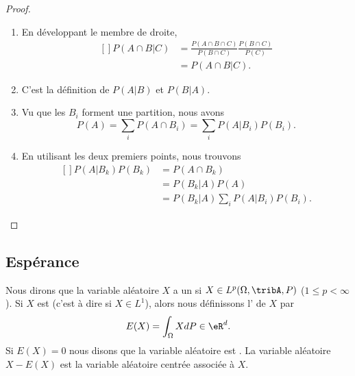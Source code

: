 \begin{proof}
    \begin{enumerate}
        \item
            En développant le membre de droite,
            \begin{equation}
                \begin{aligned}[]
                    P(A\cap B|C)&=\frac{ P(A\cap B\cap C) }{ P(B\cap C) }\frac{ P(B\cap C) }{ P(C) }\\
                    &=P(A\cap B|C).
                \end{aligned}
            \end{equation}
        \item
            C'est la définition de \( P(A|B)\) et \( P(B|A)\).
        \item
            Vu que les \( B_i\) forment une partition, nous avons
            \begin{equation}
                P(A)=\sum_iP(A\cap B_i)=\sum_iP(A|B_i)P(B_i).
            \end{equation}
        \item
            En utilisant les deux premiers points, nous trouvons
            \begin{equation}
                \begin{aligned}[]
                    P(A|B_k)P(B_k)&=P(A\cap B_k)\\
                    &=P(B_k|A)P(A)\\
                    &=P(B_k|A)\sum_iP(A|B_i)P(B_i).
                \end{aligned}
            \end{equation}
    \end{enumerate}
\end{proof}

\subsection{Espérance}

Nous dirons que la variable aléatoire \( X\) a un  si \( X\in L^p(\Omega,\tribA,P)\) (\( 1\leq p<\infty\)). Si \( X\) est  (c'est à dire si \( X\in L^1\)), alors nous définissons l' de \( X\) par
\begin{equation}
    E(X)=\int_{\Omega}XdP\in\eR^d.
\end{equation}
Si \( E(X)=0\) nous disons que la variable aléatoire est . La variable aléatoire \( X-E(X)\) est la variable aléatoire centrée associée à \( X\).

